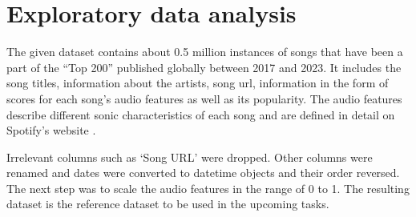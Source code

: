 \documentclass{article}
\begin{document}
 
 


\section{Exploratory data analysis}

The given dataset contains about 0.5 million instances of songs that have been a part of the “Top 200”  published globally between 2017 and 2023. It includes the song titles, information about the artists, song url, information in the form of scores for each song’s audio features as well as its popularity. 
The audio features describe different sonic characteristics of each song and are defined in detail on Spotify's website \cite{spotify_web}.


Irrelevant columns such as ‘Song URL’ were dropped. Other columns were renamed and dates were converted to datetime objects and their order reversed. The next step was to scale the audio features in the range of 0 to 1. 
The resulting dataset is the reference dataset to be used in the upcoming tasks.

\end{document}
